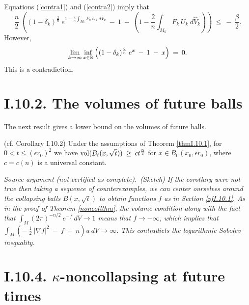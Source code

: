 Equations (\ref{contra1}) and (\ref{contra2}) imply that
\begin{equation}
\frac{n}{2} \: \left( (1 - \delta_k)^{\frac{2}{n}} \: e^{1 - \frac{2}{n} \int_{M_k}
F_k \: U_k \: d\widehat{V}_k} \: - \: 1 \: - \:
\left( 1 - \frac{2}{n} \int_{M_k}
F_k \: U_k \: d\widehat{V}_k \right) \right) \: \le \: - \: \frac{\beta}{2}.
\end{equation}
However,
\begin{equation}
\lim_{k \rightarrow \infty} \inf_{x \in {\mathbb R}}
\left(
(1 - \delta_k)^{\frac{2}{n}} \: e^{x} \: - \: 1 \: - \: x \right) \: = \: 0.
\end{equation}
This is a contradiction.


\section{I.10.2. The volumes of future balls}

The next result gives a lower bound on the volumes of future
balls.

\begin{corollary}
  \label{cor:kl-volumes-future-balls-volume-corollary}
 (cf. Corollary I.10.2) \label{corI.10.2}
Under the assumptions of Theorem \ref{thmI.10.1}, for
$0 < t \le (\epsilon r_0)^2$ we have
$\operatorname{vol}(B_t(x, \sqrt{t})) \: \ge \: c t^{\frac{n}{2}}$ for $x \in B_0(x_0, \epsilon r_0)$,
where $c = c(n)$ is a universal constant.
\end{corollary}
\par\medskip\noindent\textit{Source argument (not certified as complete).}\ \begingroup\itshape  (Sketch)
If the corollary were not true then taking a sequence of counterexamples,
we can center ourselves around the
collapsing balls $B(x, \sqrt{t})$ to obtain functions $f$ as in Section \ref{pfI.10.1}.
As in the proof of Theorem \ref{noncollthm}, the volume condition
along with the fact that $\int_M (2 \pi)^{-n/2} \: e^{-f} \: dV \rightarrow 1$
means that $f \rightarrow - \infty$, which implies that
$\int_M \left( - \: \frac12 \: |\nabla f|^2 \: - \: f \: + \: n \right) u \: dV
\rightarrow \infty$. This contradicts the logarithmic Sobolev inequality.
\endgroup\par\medskip

\section{I.10.4. $\kappa$-noncollapsing at future times}

